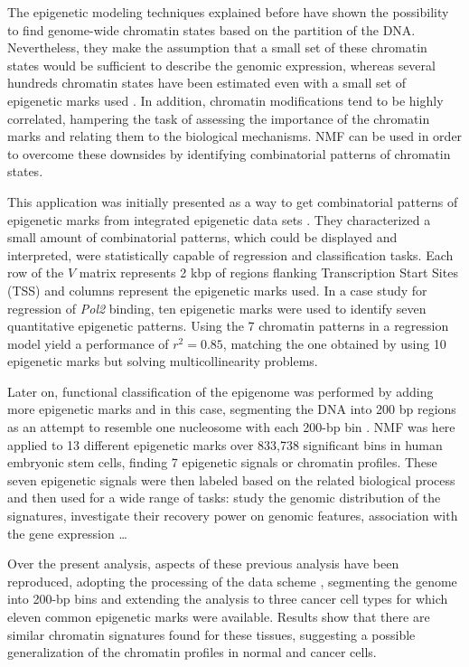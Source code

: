 The epigenetic modeling techniques explained before have shown the possibility to find genome-wide chromatin states based on the partition of the DNA. Nevertheless, they make the assumption that a small set of these chromatin states would be sufficient to describe the genomic expression, whereas several hundreds chromatin states have been estimated even with a small set of epigenetic marks used \cite{Ucar2011}. In addition, chromatin modifications tend to be highly correlated, hampering the task of assessing the importance of the chromatin marks and relating them to the biological mechanisms. NMF can be used in order to overcome these downsides by identifying combinatorial patterns of chromatin states.

\medskip

This application was initially presented as a way to get combinatorial patterns of epigenetic marks from integrated epigenetic data sets \cite{Cieslik2014}. They characterized a small amount of combinatorial patterns, which could be displayed and interpreted, were statistically capable of regression and classification tasks. Each row of the \(V\) matrix represents 2 kbp of regions flanking Transcription Start Sites (TSS) and columns represent the epigenetic marks used. In a case study for regression of \textit{Pol2} binding, ten epigenetic marks were used to identify seven quantitative epigenetic patterns. Using the 7 chromatin patterns in a regression model yield a performance of \( r^2 = 0.85 \), matching the one obtained by using 10 epigenetic marks but solving multicollinearity problems.

\medskip

Later on, functional classification of the epigenome was performed by adding more epigenetic marks and in this case, segmenting the DNA into 200 bp regions as an attempt to resemble one nucleosome with each 200-bp bin \cite{Gandolfi2017}. NMF was here applied to 13 different epigenetic marks over 833,738 significant bins in human embryonic stem cells, finding 7 epigenetic signals or chromatin profiles. These seven epigenetic signals were then labeled based on the related biological process and then used for a wide range of tasks: study the genomic distribution of the signatures, investigate their recovery power on genomic features, association with the gene expression \ldots

\medskip

Over the present analysis, aspects of these previous analysis have been reproduced, adopting the processing of the data scheme \cite{Gandolfi2017}, segmenting the genome into 200-bp bins and extending the analysis to three cancer cell types for which eleven common epigenetic marks were available. Results show that there are similar chromatin signatures found for these tissues, suggesting a possible generalization of the chromatin profiles in normal and cancer cells.
